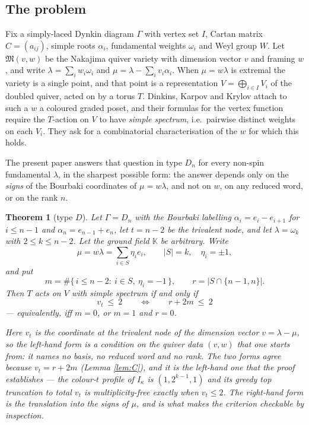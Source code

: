 \documentclass[reqno]{amsart}
\theoremstyle{plain}
\newtheorem{theorem}{Theorem}[section]
\theoremstyle{definition}
\newcommand{\la}{\lambda}
\newcommand{\al}{\alpha}
\newcommand{\om}{\omega}
\newcommand{\ka}{\kappa}
\begin{document}
\subsection{The problem}
Fix a simply-laced Dynkin diagram $\Gamma$ with vertex set $I$, Cartan matrix
$C=(a_{ij})$, simple roots $\al_i$, fundamental weights $\om_i$ and Weyl group
$W$.  Let $\mathfrak{M}(v,w)$ be the Nakajima quiver variety \cite{Nak} with dimension
vector $v$ and framing $w$, and write $\la=\sum_iw_i\om_i$ and
$\mu=\la-\sum_iv_i\al_i$.  When $\mu=w\la$ is extremal the variety is a single
point, and that point is a representation $V=\bigoplus_{i\in I}V_i$ of the
doubled quiver, acted on by a torus $T$.  Dinkins, Karpov and Krylov
\cite[\S5.4]{DKK} attach to such a $w$ a coloured graded poset, and their
formulas for the vertex function require the $T$-action on $V$ to have
\emph{simple spectrum}, i.e.\ pairwise distinct weights on each $V_i$.  They
ask \cite[\S5.4.2]{DKK} for a combinatorial characterisation of the $w$ for
which this holds.

The present paper answers that question in type $D_n$ for every non-spin
fundamental $\la$, in the sharpest possible form: the answer depends only on
the \emph{signs} of the Bourbaki coordinates of $\mu=w\la$, and not on $w$,
on any reduced word, or on the rank $n$.

\begin{theorem}[type $D$]\label{thm:typeD}
Let $\Gamma=D_n$ with the Bourbaki labelling $\al_i=e_i-e_{i+1}$ for
$i\le n-1$ and $\al_n=e_{n-1}+e_n$, let $t=n-2$ be the trivalent node, and let
$\la=\om_k$ with $2\le k\le n-2$.  Let the ground field $\mathbb{K}$ be
arbitrary.  Write
\[
   \mu=w\la=\sum_{i\in S}\eta_ie_i,\qquad |S|=k,\quad \eta_i=\pm1,
\]
and put
\[
   m=\#\{\,i\le n-2:\ i\in S,\ \eta_i=-1\,\},
   \qquad
   r=|S\cap\{n-1,n\}| .
\]
Then $T$ acts on $V$ with simple spectrum if and only if
\[
   \boxed{\ v_t\ \le\ 2
   \qquad\Longleftrightarrow\qquad
   r+2m\ \le\ 2\ }
\]
--- equivalently, iff $m=0$, or $m=1$ and $r=0$.

Here $v_t$ is the coordinate at the trivalent node of the dimension vector
$v=\la-\mu$, so the left-hand form is a condition on the quiver data $(v,w)$
that one starts from: it names no basis, no reduced word and no rank.  The two
forms agree because $v_t=r+2m$ (Lemma \ref{lem:C}), and it is the left-hand one
that the proof establishes --- the colour-$t$ profile of $I_\ka$ is
$(1,2^{k-1},1)$ and its greedy top truncation to total $v_t$ is
multiplicity-free exactly when $v_t\le2$.  The right-hand form is the
translation into the signs of $\mu$, and is what makes the criterion checkable
by inspection.
\end{theorem}
\end{document}
